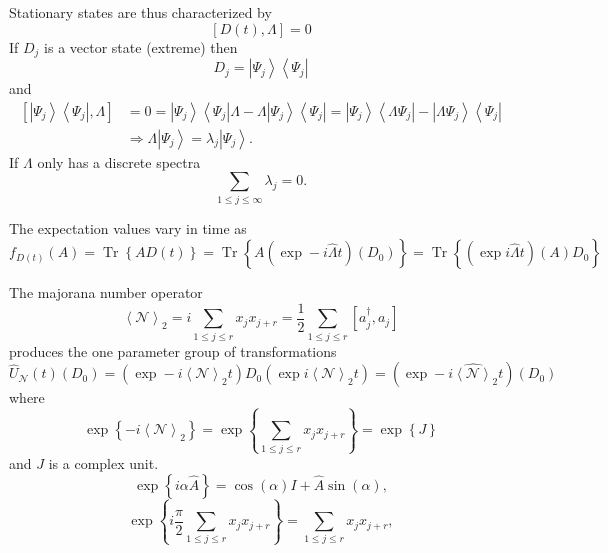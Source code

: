 \documentclass[aps,preprint]{revtex4}%
\begin{document}
Stationary states are thus characterized by
\begin{equation}
\left[  D\left(  t\right)  ,\Lambda\right]  =0
\end{equation}
If $D_{j}$ is a vector state (extreme) then
\begin{equation}
D_{j}=\left\vert \Psi_{j}\right\rangle \left\langle \Psi_{j}\right\vert
\end{equation}
and%
\begin{align}
\left[  \left\vert \Psi_{j}\right\rangle \left\langle \Psi_{j}\right\vert
,\Lambda\right]   &  =0=\left\vert \Psi_{j}\right\rangle \left\langle \Psi
_{j}\right\vert \Lambda-\Lambda\left\vert \Psi_{j}\right\rangle \left\langle
\Psi_{j}\right\vert =\left\vert \Psi_{j}\right\rangle \left\langle \Lambda
\Psi_{j}\right\vert -\left\vert \Lambda\Psi_{j}\right\rangle \left\langle
\Psi_{j}\right\vert \\
&  \Rightarrow\Lambda\left\vert \Psi_{j}\right\rangle =\lambda_{j}\left\vert
\Psi_{j}\right\rangle .
\end{align}
If $\Lambda$ only has a discrete spectra
\begin{equation}
\sum_{1\leq j\leq\infty}\lambda_{j}=0.
\end{equation}


The expectation values vary in time as
\begin{equation}
f_{D\left(  t\right)  }\left(  A\right)  =\operatorname{Tr}\left\{  AD\left(
t\right)  \right\}  =\operatorname{Tr}\left\{  A\left(  \exp-i\hat{\Lambda
}t\right)  \left(  D_{0}\right)  \right\}  =\operatorname{Tr}\left\{  \left(
\exp i\hat{\Lambda}t\right)  \left(  A\right)  D_{0}\right\}
\end{equation}


The majorana number operator
\begin{equation}
\left\langle \mathcal{N}\right\rangle _{2}=i\sum_{1\leq j\leq r}x_{j}%
x_{j+r}=\frac{1}{2}\sum_{1\leq j\leq r}\left[  a_{j}^{\dagger},a_{j}\right]
\end{equation}
produces the one parameter group of transformations
\begin{equation}
\hat{U}_{\mathcal{N}}\left(  t\right)  \left(  D_{0}\right)  =\left(
\exp-i\left\langle \mathcal{N}\right\rangle _{2}t\right)  D_{0}\left(  \exp
i\left\langle \mathcal{N}\right\rangle _{2}t\right)  =\left(  \exp
-\widehat{i\left\langle \mathcal{N}\right\rangle _{2}}t\right)  \left(
D_{0}\right)
\end{equation}
where
\begin{equation}
\exp\left\{  -i\left\langle \mathcal{N}\right\rangle _{2}\right\}
=\exp\left\{  \sum_{1\leq j\leq r}x_{j}x_{j+r}\right\}  =\exp\left\{
J\right\}
\end{equation}
and $J$ is a complex unit.%
\begin{equation}
\exp\left\{  i\alpha\hat{A}\right\}  =\cos\left(  \alpha\right)  I+\hat{A}%
\sin\left(  \alpha\right)  ,
\end{equation}%
\begin{equation}
\exp\left\{  i\frac{\pi}{2}\sum_{1\leq j\leq r}x_{j}x_{j+r}\right\}
=\sum_{1\leq j\leq r}x_{j}x_{j+r},
\end{equation}
\end{document}
